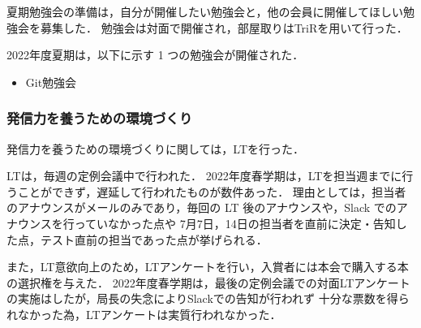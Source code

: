 夏期勉強会の準備は，自分が開催したい勉強会と，他の会員に開催してほしい勉強会を募集した．
勉強会は対面で開催され，部屋取りはTriRを用いて行った．

2022年度夏期は，以下に示す 1 つの勉強会が開催された．

\begin{itemize}
    \item Git勉強会
\end{itemize}


\subsubsection*{発信力を養うための環境づくり}
発信力を養うための環境づくりに関しては，LTを行った．

LTは，毎週の定例会議中で行われた．
2022年度春学期は，LTを担当週までに行うことができず，遅延して行われたものが数件あった．
理由としては，担当者のアナウンスがメールのみであり，毎回の LT 後のアナウンスや，Slack でのアナウンスを行っていなかった点や
7月7日，14日の担当者を直前に決定・告知した点，テスト直前の担当であった点が挙げられる．

また，LT意欲向上のため，LTアンケートを行い，入賞者には本会で購入する本の選択権を与えた．
2022年度春学期は，最後の定例会議での対面LTアンケートの実施はしたが，局長の失念によりSlackでの告知が行われず
十分な票数を得られなかった為，LTアンケートは実質行われなかった．
